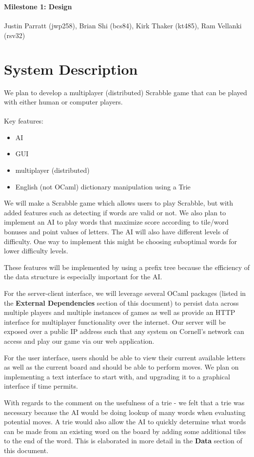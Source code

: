 \documentclass[2pt]{journal}
\begin{document}
\noindent
\LARGE
\textbf{Milestone 1: Design} \\ \\
\large
Justin Parratt (jwp258), Brian Shi (bcs84), Kirk Thaker (kt485), Ram Vellanki (rsv32)

\section{System Description}
We plan to develop a multiplayer (distributed) Scrabble game that can be played with either human or computer players. \\ \\
Key features:
\begin{itemize}
    \item AI
    \item GUI
    \item multiplayer (distributed)
    \item English (not OCaml) dictionary manipulation using a Trie
\end{itemize}

We will make a Scrabble game which allows users to play Scrabble, but with added features such as detecting if words are valid or not. We also plan to implement an AI to play words that maximize score according to tile/word bonuses and point values of letters. The AI will also have different levels of difficulty. One way to implement this might be choosing suboptimal words for lower difficulty levels.

These features will be implemented by using a prefix tree because the efficiency of the data structure is especially important for the AI.

For the server-client interface, we will leverage several OCaml packages (listed in the \textbf{External Dependencies} section of this document) to persist data across multiple players and multiple instances of games as well as provide an HTTP interface for multiplayer functionality over the internet. Our server will be exposed over a public IP address such that any system on Cornell's network can access and play our game via our web application.

For the user interface, users should be able to view their current available letters as well as the current board and should be able to perform moves. We plan on implementing a text interface to start with, and upgrading it to a graphical interface if time permits.

With regards to the comment on the usefulness of a trie - we felt that a trie was necessary because the AI would be doing lookup of many words when evaluating potential moves. A trie would also allow the AI to quickly determine what words can be made from an existing word on the board by adding some additional tiles to the end of the word. This is elaborated in more detail in the \textbf{Data} section of this document.
\end{document}
